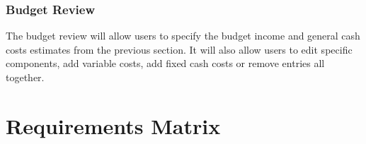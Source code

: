 \documentclass[onecolumn, draftclsnofoot,10pt, compsoc]{article}
\begin{document}
		\subsubsection{Budget Review}
		The budget review will allow users to specify the budget income and general cash costs estimates from the previous section. It will also allow users to edit specific components, add variable costs, add fixed cash costs or remove entries all together.




\section{Requirements Matrix}
\end{document}
